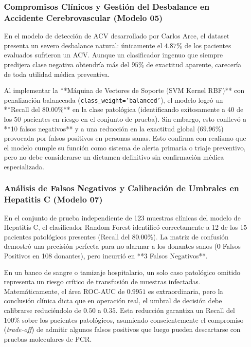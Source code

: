 \documentclass[12pt,letterpaper]{article}
\begin{document}
\subsubsection{Compromisos Clínicos y Gestión del Desbalance en Accidente Cerebrovascular (Modelo 05)}
En el modelo de detección de ACV desarrollado por Carlos Arce, el dataset presenta un severo desbalance natural: únicamente el $4.87\%$ de los pacientes evaluados sufrieron un ACV. Aunque un clasificador ingenuo que siempre predijera clase negativa obtendría más del $95\%$ de exactitud aparente, carecería de toda utilidad médica preventiva.

Al implementar la **Máquina de Vectores de Soporte (SVM Kernel RBF)** con penalización balanceada (\texttt{class\_weight='balanced'}), el modelo logró un **Recall del 80.00\%** en la clase patológica (identificando exitosamente a 40 de los 50 pacientes en riesgo en el conjunto de prueba). Sin embargo, esto conllevó a **10 falsos negativos** y a una reducción en la exactitud global ($69.96\%$) provocada por falsos positivos en personas sanas. Esto confirma con realismo que el modelo cumple su función como sistema de alerta primaria o triaje preventivo, pero no debe considerarse un dictamen definitivo sin confirmación médica especializada.

\subsubsection{Análisis de Falsos Negativos y Calibración de Umbrales en Hepatitis C (Modelo 07)}
En el conjunto de prueba independiente de 123 muestras clínicas del modelo de Hepatitis C, el clasificador Random Forest identificó correctamente a 12 de los 15 pacientes patológicos presentes (Recall del $80.00\%$). La matriz de confusión demostró una precisión perfecta para no alarmar a los donantes sanos (0 Falsos Positivos en 108 donantes), pero incurrió en **3 Falsos Negativos**.

En un banco de sangre o tamizaje hospitalario, un solo caso patológico omitido representa un riesgo crítico de transfusión de muestras infectadas. Matemáticamente, el área ROC-AUC de $0.9951$ es extraordinaria, pero la conclusión clínica dicta que en operación real, el umbral de decisión debe calibrarse reduciéndolo de $0.50$ a $0.35$. Esta reducción garantiza un Recall del $100\%$ sobre los pacientes patológicos, asumiendo conscientemente el compromiso (\textit{trade-off}) de admitir algunos falsos positivos que luego pueden descartarse con pruebas moleculares de PCR.
\end{document}

